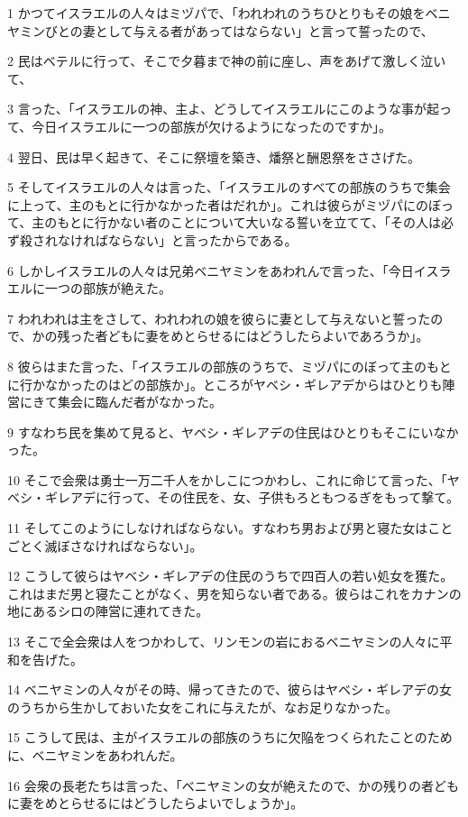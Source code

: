 \par 1 かつてイスラエルの人々はミヅパで、「われわれのうちひとりもその娘をベニヤミンびとの妻として与える者があってはならない」と言って誓ったので、
\par 2 民はベテルに行って、そこで夕暮まで神の前に座し、声をあげて激しく泣いて、
\par 3 言った、「イスラエルの神、主よ、どうしてイスラエルにこのような事が起って、今日イスラエルに一つの部族が欠けるようになったのですか」。
\par 4 翌日、民は早く起きて、そこに祭壇を築き、燔祭と酬恩祭をささげた。
\par 5 そしてイスラエルの人々は言った、「イスラエルのすべての部族のうちで集会に上って、主のもとに行かなかった者はだれか」。これは彼らがミヅパにのぼって、主のもとに行かない者のことについて大いなる誓いを立てて、「その人は必ず殺されなければならない」と言ったからである。
\par 6 しかしイスラエルの人々は兄弟ベニヤミンをあわれんで言った、「今日イスラエルに一つの部族が絶えた。
\par 7 われわれは主をさして、われわれの娘を彼らに妻として与えないと誓ったので、かの残った者どもに妻をめとらせるにはどうしたらよいであろうか」。
\par 8 彼らはまた言った、「イスラエルの部族のうちで、ミヅパにのぼって主のもとに行かなかったのはどの部族か」。ところがヤベシ・ギレアデからはひとりも陣営にきて集会に臨んだ者がなかった。
\par 9 すなわち民を集めて見ると、ヤベシ・ギレアデの住民はひとりもそこにいなかった。
\par 10 そこで会衆は勇士一万二千人をかしこにつかわし、これに命じて言った、「ヤベシ・ギレアデに行って、その住民を、女、子供もろともつるぎをもって撃て。
\par 11 そしてこのようにしなければならない。すなわち男および男と寝た女はことごとく滅ぼさなければならない」。
\par 12 こうして彼らはヤベシ・ギレアデの住民のうちで四百人の若い処女を獲た。これはまだ男と寝たことがなく、男を知らない者である。彼らはこれをカナンの地にあるシロの陣営に連れてきた。
\par 13 そこで全会衆は人をつかわして、リンモンの岩におるベニヤミンの人々に平和を告げた。
\par 14 ベニヤミンの人々がその時、帰ってきたので、彼らはヤベシ・ギレアデの女のうちから生かしておいた女をこれに与えたが、なお足りなかった。
\par 15 こうして民は、主がイスラエルの部族のうちに欠陥をつくられたことのために、ベニヤミンをあわれんだ。
\par 16 会衆の長老たちは言った、「ベニヤミンの女が絶えたので、かの残りの者どもに妻をめとらせるにはどうしたらよいでしょうか」。
